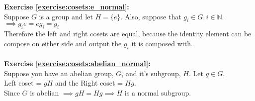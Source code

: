 \noindent\textbf{Exercise \ref{exercise:cosets:e_normal}:}
\\
Suppose $G$ is a group and let $H = \{e\}$.  Also, suppose that $g_i \in G, i \in {\mathbb N}$.
\\
$\implies g_ie = eg_i = g_i$
\\
Therefore the left and right cosets are equal, because the identity element can be compose on either side and output the $g_i$ it is composed with.
\\
\\
\noindent\textbf{Exercise \ref{exercise:cosets:abelian_normal}:}
\\
Suppose you have an abelian group, $G$, and it's subgroup, $H$. Let $g \in G$.
\\
Left coset = $gH$ and the Right coset = $Hg$.
\\
Since $G$ is abelian $\implies gH = Hg \implies H$ is a normal subgroup.
\\
\\


